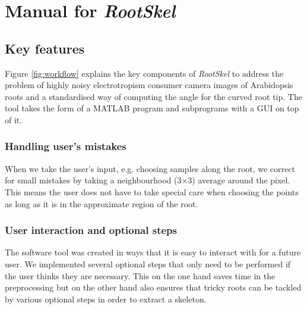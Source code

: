 \chapter{Manual for \textit{RootSkel}}\label{chp:manual}


\section{Key features} %

Figure \ref{fig:workflow} explains the key components of %
\textit{RootSkel} to address the problem of highly noisy electrotropism consumer camera images of Arabidopsis roots and a standardised way of computing the angle for the curved root tip. 
The tool takes the form of a MATLAB program and subprograms with a GUI on top of it.

\subsection{Handling user's mistakes}

When we take the user's input, e.g. choosing samples along the root, we correct for small mistakes by taking a neighbourhood (3\(\times\)3) average around the pixel. 
This means the user does not have to take special care when choosing the points as long as it is in the approximate region of the root.

\subsection{User interaction and optional steps}
The software tool was created in ways that it is easy to interact with for a future user. 
We implemented several optional steps that only need to be performed if the user thinks they are necessary. This on the one hand saves time in the preprocessing but on the other hand also ensures that tricky roots can be tackled by various optional steps in order to extract a skeleton. 

